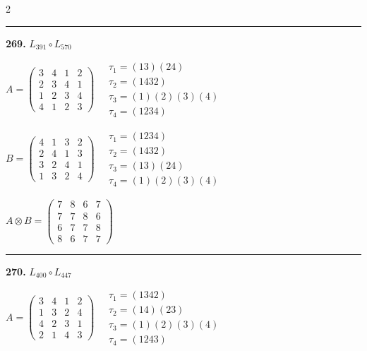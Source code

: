 \begin{multicols}{2}
\vspace{0.3em}
\hrule
\vspace{0.3em}

\noindent\textbf{269.} $L_{391} \circ L_{570}$

$A = \begin{pmatrix} 3 & 4 & 1 & 2 \\ 2 & 3 & 4 & 1 \\ 1 & 2 & 3 & 4 \\ 4 & 1 & 2 & 3 \end{pmatrix} \quad \begin{matrix} \tau_{1}=(1 3)(2 4) \\ \tau_{2}=(1 4 3 2) \\ \tau_{3}=(1)(2)(3)(4) \\ \tau_{4}=(1 2 3 4) \end{matrix}$

$B = \begin{pmatrix} 4 & 1 & 3 & 2 \\ 2 & 4 & 1 & 3 \\ 3 & 2 & 4 & 1 \\ 1 & 3 & 2 & 4 \end{pmatrix} \quad \begin{matrix} \tau_{1}=(1 2 3 4) \\ \tau_{2}=(1 4 3 2) \\ \tau_{3}=(1 3)(2 4) \\ \tau_{4}=(1)(2)(3)(4) \end{matrix}$

$A \otimes B = \begin{pmatrix} 7 & 8 & 6 & 7 \\ 7 & 7 & 8 & 6 \\ 6 & 7 & 7 & 8 \\ 8 & 6 & 7 & 7 \end{pmatrix}$

\vspace{0.3em}
\hrule
\vspace{0.3em}

\noindent\textbf{270.} $L_{400} \circ L_{447}$

$A = \begin{pmatrix} 3 & 4 & 1 & 2 \\ 1 & 3 & 2 & 4 \\ 4 & 2 & 3 & 1 \\ 2 & 1 & 4 & 3 \end{pmatrix} \quad \begin{matrix} \tau_{1}=(1 3 4 2) \\ \tau_{2}=(1 4)(2 3) \\ \tau_{3}=(1)(2)(3)(4) \\ \tau_{4}=(1 2 4 3) \end{matrix}$


\end{multicols}
